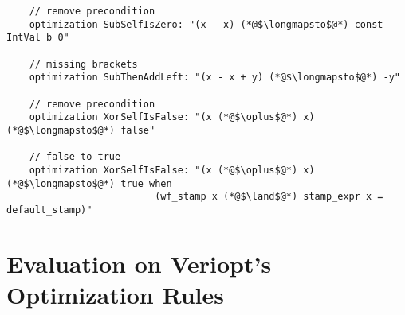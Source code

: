 \begin{appendices}
\begin{lstlisting}
    // remove precondition
    optimization SubSelfIsZero: "(x - x) (*@$\longmapsto$@*) const IntVal b 0" 

    // missing brackets
    optimization SubThenAddLeft: "(x - x + y) (*@$\longmapsto$@*) -y" 

    // remove precondition
    optimization XorSelfIsFalse: "(x (*@$\oplus$@*) x) (*@$\longmapsto$@*) false" 

    // false to true
    optimization XorSelfIsFalse: "(x (*@$\oplus$@*) x) (*@$\longmapsto$@*) true when 
                          (wf_stamp x (*@$\land$@*) stamp_expr x = default_stamp)" 
\end{lstlisting}

\chapter{Evaluation on Veriopt's Optimization Rules}


\end{appendices}
